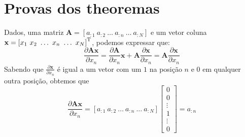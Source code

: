 \section{Provas dos theoremas}

\begin{myproofT}\label{proof:theo:derAx}
Dados,
uma matriz $\mathbf{A}=\left[a_{:1}~ a_{:2}~ \hdots~ a_{:n}~ \hdots~ a_{:N}\right]$ e 
um vetor coluna $\mathbf{x}=\left[x_{1}~ x_{2}~ \hdots~ x_{n}~ \hdots~ x_{N}\right]^{\mathrm{T}}$, 
podemos expressar que:
\begin{equation}
\frac{\partial \mathbf{A}\mathbf{x}}{\partial x_n}=
\frac{\partial \mathbf{A}}{\partial x_n}\mathbf{x}+\mathbf{A}\frac{\partial \mathbf{x}}{\partial x_n}=
\mathbf{A}\frac{\partial \mathbf{x}}{\partial x_n}
\end{equation}
Sabendo que $\frac{\partial \mathbf{x}}{\partial x_n}$ é igual a um vetor 
com um $1$ na posição $n$ e $0$ em qualquer outra posição, obtemos que
\begin{equation}
\frac{\partial \mathbf{A}\mathbf{x}}{\partial x_n}=
\left[a_{:1}~ a_{:2}~ \hdots~ a_{:n}~ \hdots~ a_{:N}\right]\left[
\begin{matrix}
 0\\
 0\\
 \vdots\\
 1\\
 \vdots\\
 0
\end{matrix}
\right]=a_{:n}
\end{equation}
\end{myproofT}

